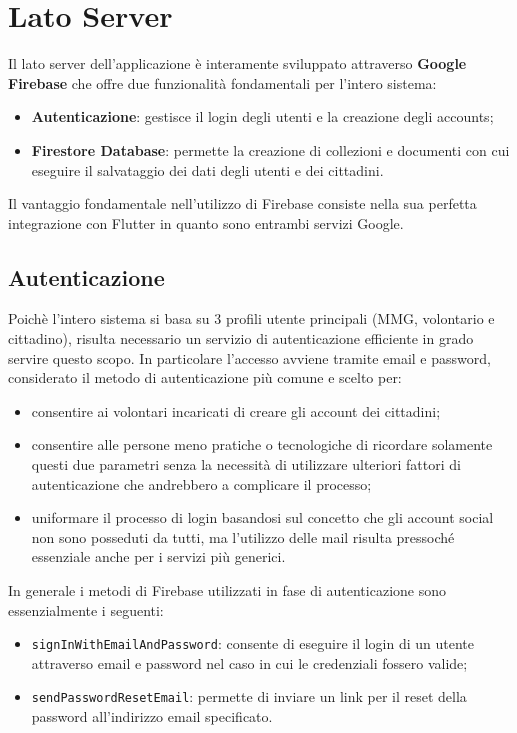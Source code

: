 \documentclass[12pt,a4paper,twoside,openright,titlepage]{book}
\begin{document}
\section{Lato Server}
Il lato server dell'applicazione è interamente sviluppato attraverso \textbf{Google Firebase} che offre due funzionalità fondamentali per l'intero sistema:
\begin{itemize}
\item \textbf{Autenticazione}: gestisce il login degli utenti e la creazione degli accounts;
\item \textbf{Firestore Database}: permette la creazione di collezioni e documenti con cui eseguire il salvataggio dei dati degli utenti e dei cittadini.
\end{itemize}
Il vantaggio fondamentale nell'utilizzo di Firebase consiste nella sua perfetta integrazione con Flutter in quanto sono entrambi servizi Google.

\subsection{Autenticazione}
Poichè l'intero sistema si basa su 3 profili utente principali (MMG, volontario e cittadino), risulta necessario un servizio di autenticazione efficiente in grado servire questo scopo. In particolare l'accesso avviene tramite email e password, considerato il metodo di autenticazione più comune e scelto per:
\begin{itemize}
\item consentire ai volontari incaricati di creare gli account dei cittadini;
\item consentire alle persone meno pratiche o tecnologiche di ricordare solamente questi due parametri senza la necessità di utilizzare ulteriori fattori di autenticazione che andrebbero a complicare il processo;
\item uniformare il processo di login basandosi sul concetto che gli account social non sono posseduti da tutti, ma l'utilizzo delle mail risulta pressoché essenziale anche per i servizi più generici.
\end{itemize}
In generale i metodi di Firebase utilizzati in fase di autenticazione sono essenzialmente i seguenti:
\begin{itemize}
\item \texttt{signInWithEmailAndPassword}: consente di eseguire il login di un utente attraverso email e password nel caso in cui le credenziali fossero valide;
\item \texttt{sendPasswordResetEmail}: permette di inviare un link per il reset della password all'indirizzo email specificato.
\end{itemize}
\end{document}
